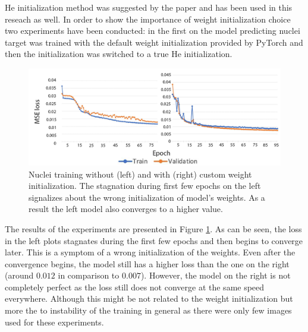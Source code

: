 He initialization method was suggested by the \cite{Lachance_2020} paper and has been used in this reseach as well. In order to show the importance of weight initialization choice two experiments have been conducted: in the first on the model predicting nuclei target was trained with the default weight initialization provided by PyTorch and then the initialization was switched to a true He initialization.

\begin{figure}[H]
	\begin{center}
		\includegraphics[width=0.8\linewidth]{bilder/nuclei/wi-no-wi.png}
		\caption[Nuclei training without (left) and with (right) custom weight initialization]%
		{Nuclei training without (left) and with (right) custom weight initialization. The stagnation during first few epochs on the left signalizes about the wrong initialization of model's weights. As a result the left model also converges to a higher value.}\label{fig:wi}
	\end{center}
\end{figure}

The results of the experiments are presented in Figure \ref{fig:wi}. As can be seen, the loss in the left plots stagnates during the first few epochs and then begins to converge later. This is a symptom of a wrong initialization of the weights. Even after the convergence begins, the model still has a higher loss than the one on the right (around $0.012$ in comparison to $0.007$). However, the model on the right is not completely perfect as the loss still does not converge at the same speed everywhere. Although this might be not related to the weight initialization but more the to instability of the training in general as there were only few images used for these experiments.
